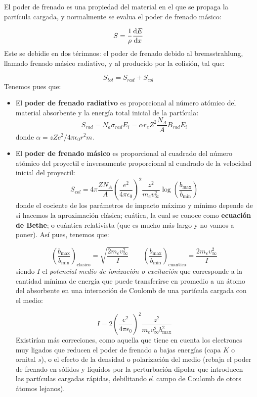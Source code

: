 El poder de frenado es una propiedad del material en el que se propaga la partícula cargada, y normalmente se evalua el poder de frenado másico:

\begin{equation}
    S = \frac{1}{\rho} \dv{E}{x}
\end{equation}
Este se debidie en dos térimnos: el poder de frenado debido al bremsstrahlung, llamado frenado másico radiativo, y al producido por la colisión, tal que:

\begin{equation}
    S_{tot} = S_{rad} + S_{col}
\end{equation}
Tenemos pues que:

\begin{itemize}
    \item El \textbf{poder de frenado radiativo} es proporcional al número atómico del material absorbente y la energía total inicial de la partícula:
    \begin{equation}
        S_{rad} = N_a \sigma_{rad} E_i = \alpha r_e Z^2 \frac{N_A}{A} B_{rad} E_i 
    \end{equation}
    donde $\alpha = zZe^2/4\pi\epsilon_0r^2 m$. 
    \item El \textbf{poder de frenado másico} es proporcional al cuadrado del número atómico del proyectil e inversamente proporcional al cuadrado de la velocidad inicial del proyectil:
    \begin{equation}
        S_{col} = 4\pi \frac{Z N_A}{A} \left( \frac{e^2}{4\pi\epsilon_0} \right)^2 \frac{z^2}{m_e v_\infty^2} \log \left( \frac{b_{\max}}{b_{\min}} \right)
    \end{equation}
    donde el cociente de los parámetros de impacto máximo y mínimo depende de si hacemos la aproximación clásica; cuática, la cual se conoce como \textbf{ecuación de Bethe}; o cuántica relativista (que es mucho más largo y no vamos a poner). Así pues, tenemos que:

    \begin{equation}
        \left( {\frac{b_{\max}}{b_{\min}}} \right)_{\text{clasico}} = \sqrt{\frac{2m_e v_{\infty}^2}{I}}  \qquad
        \left( {\frac{b_{\max}}{b_{\min}}} \right)_{\text{cuantico}} = {\frac{2m_e v_{\infty}^2}{I}}
    \end{equation}
    siendo $I$ el \textit{potencial medio de ionización o excitación} que corresponde a la cantidad mínima de energía que puede transferirse en promedio a un átomo del absorbente en una interacción de Coulomb de una partícula cargada con el medio: 

    \begin{equation}
        I = 2 \left( {\frac{e^2}{4\pi\epsilon_0}} \right)^2 \frac{z^2}{m_e v_{\infty}^2 b_{\max}^2}
    \end{equation}
    Existirían más correciones, como aquella que tiene en cuenta los elcetrones muy ligados que reducen el poder de frenado a bajas energías (capa $K$ o ornital $s$), o el efecto de la densidad o polarización del medio (rebaja el poder de frenado en sólidos y líquidos por la perturbación dipolar que introducen las partículas cargadas rápidas, debilitando el campo de Coulomb de otors átomos lejanos).
\end{itemize}

